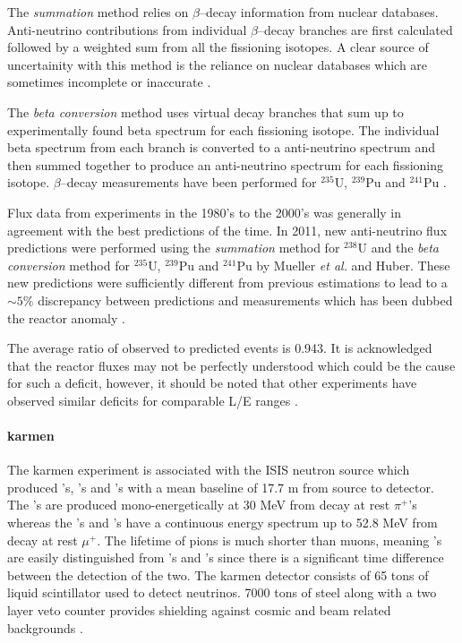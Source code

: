 The \textit{summation} method relies on $\beta$--decay information from nuclear databases. Anti-neutrino contributions from individual $\beta$--decay branches are first calculated followed by a weighted sum from all the fissioning isotopes. A clear source of uncertainity with this method is the reliance on nuclear databases which are sometimes incomplete or inaccurate \cite{snowmass_2021}. 

The \textit{beta conversion} method uses virtual decay branches that sum up to experimentally found beta spectrum for each fissioning isotope. The individual beta spectrum from each branch is converted to a anti-neutrino spectrum and then summed together to produce an anti-neutrino spectrum for each fissioning isotope. $\beta$--decay measurements have been performed for $^{235}$U, $^{239}$Pu and $^{241}$Pu \cite{snowmass_2021}.

Flux data from experiments in the 1980's to the 2000's was generally in agreement with the best predictions of the time. In 2011, new anti-neutrino flux predictions were performed using the \textit{summation} method for $^{238}$U and the \textit{beta conversion} method for $^{235}$U, $^{239}$Pu and $^{241}$Pu by Mueller \textit{et al.} and Huber. These new predictions were sufficiently different from previous estimations to lead to a $\sim5\%$ discrepancy between predictions and measurements which has been dubbed the reactor anomaly \cite{snowmass_2021}. 

The average ratio of observed to predicted events is 0.943. It is acknowledged that the reactor fluxes may not be perfectly understood which could be the cause for such a deficit, however, it should be noted that other experiments have observed similar deficits for comparable L/E ranges \cite{Reactor_anomaly}.

\paragraph{\gls{karmen}}
The \gls{karmen} experiment is associated with the ISIS neutron source which produced \numu's, \numubar's and \nue's with a mean baseline of 17.7 m from source to detector. The \numu's are produced mono-energetically at 30 MeV from decay at rest $\pi^+$'s whereas the \numubar's and \nue's have a continuous energy spectrum up to 52.8 MeV from decay at rest $\mu^+$. The lifetime of pions is much shorter than muons, meaning \numu's are easily distinguished from \numubar's and \nue's since there is a significant time difference between the detection of the two. The \gls{karmen} detector consists of 65 tons of liquid scintillator used to detect neutrinos. 7000 tons of steel along with a two layer veto counter provides shielding against cosmic and beam related backgrounds \cite{Upper_limits_for_neutrino_oscillations_numubar_to_nuebar_from_muon_decay_at_rest}. 

